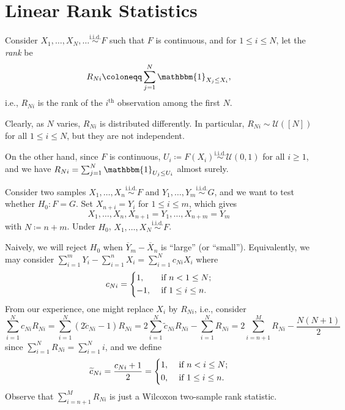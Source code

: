 \section{Linear Rank Statistics}
Consider \(X_1, \dots , X_N, \dots \overset{\text{i.i.d.} }{\sim } F\) such that \(F\) is continuous, and for \(1 \leq i \leq N\), let the \emph{rank} be
\[
	R_{Ni}
	\coloneqq \sum_{j=1}^{N} \mathbbm{1}_{X_j \leq X_i},
\]
i.e., \(R_{Ni}\) is the rank of the \(i^{\text{th} }\) observation among the first \(N\).

\begin{remark}
	Clearly, as \(N\) varies, \(R_{Ni}\) is distributed differently. In particular, \(R_{Ni} \sim \mathcal{U} ([N])\) for all \(1 \leq i \leq N\), but they are not independent.
\end{remark}

\begin{remark}
	On the other hand, since \(F\) is continuous, \(U_i \coloneqq F(X_i)\overset{\text{i.i.d.} }{\sim } \mathcal{U} (0, 1)\) for all \(i \geq 1\), and we have \(R_{Ni} = \sum_{j=1}^{N} \mathbbm{1}_{U_j \leq U_i} \) almost surely.
\end{remark}

\begin{eg}
	Consider two samples \(X_1, \dots , X_n \overset{\text{i.i.d.} }{\sim } F\) and \(Y_1, \dots , Y_m \overset{\text{i.i.d.} }{\sim } G\), and we want to test whether \(H_0 \colon F = G\). Set \(X_{n+i} = Y_i\) for \(1 \leq i \leq m\), which gives
	\[
		X_1, \dots , X_n , X_{n+1} = Y_1, \dots , X_{n+m} = Y_m
	\]
	with \(N \coloneqq n + m\). Under \(H_0\), \(X_1, \dots , X_N \overset{\text{i.i.d.} }{\sim } F\).

	Naively, we will reject \(H_0\) when \(\overline{Y} _m - \overline{X} _n\) is ``large'' (or ``small''). Equivalently, we may consider \(\sum_{i=1}^{m} Y_i - \sum_{i=1}^{n} X_i = \sum_{i=1}^{N} c_{Ni} X_i\) where
	\[
		c_{Ni}
		= \begin{dcases}
			1,  & \text{ if } n < 1 \leq N ;   \\
			-1, & \text{ if } 1 \leq i \leq n.
		\end{dcases}
	\]
	From our experience, one might replace \(X_i\) by \(R_{Ni}\), i.e., consider
	\[
		\sum_{i=1}^{N} c_{Ni} R_{Ni}
		= \sum_{i=1}^{N} (2 \widetilde{c} _{Ni} - 1) R_{Ni}
		= 2 \sum_{i=1}^{N} \widetilde{c} _{Ni} R_{Ni} - \sum_{i=1}^{N} R_{Ni}
		= 2 \sum_{i=n+1}^{M} R_{Ni} - \frac{N(N+1)}{2}
	\]
	since \(\sum_{i=1}^{N} R_{Ni} = \sum_{i=1}^{N} i\), and we define
	\[
		\widetilde{c} _{Ni}
		= \frac{c_{Ni} + 1}{2}
		= \begin{dcases}
			1, & \text{ if } n < i \leq N ;   \\
			0, & \text{ if } 1 \leq i \leq n.
		\end{dcases}
	\]
	Observe that \(\sum_{i=n+1}^{M} R_{Ni}\) is just a Wilcoxon two-sample rank statistic.
\end{eg}

